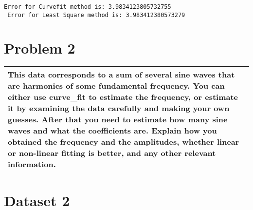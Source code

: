 \documentclass[11pt]{article}
\begin{document}
    \begin{Verbatim}[commandchars=\\\{\}]
Error for Curvefit method is: 3.9834123805732755
 Error for Least Square method is: 3.983412380573279
    \end{Verbatim}

    \hypertarget{problem-2}{%
\section{Problem 2}\label{problem-2}}

\begin{longtable}[]{@{}l@{}}
\toprule
\endhead
\begin{minipage}[t]{0.07\columnwidth}\raggedright
This data corresponds to a sum of several sine waves that are harmonics
of some fundamental frequency. You can either use curve\_fit to estimate
the frequency, or estimate it by examining the data carefully and making
your own guesses. After that you need to estimate how many sine waves
and what the coefficients are. Explain how you obtained the frequency
and the amplitudes, whether linear or non-linear fitting is better, and
any other relevant information.\strut
\end{minipage}\tabularnewline
\bottomrule
\end{longtable}

    \hypertarget{dataset-2}{%
\section{Dataset 2}\label{dataset-2}}
\end{document}
